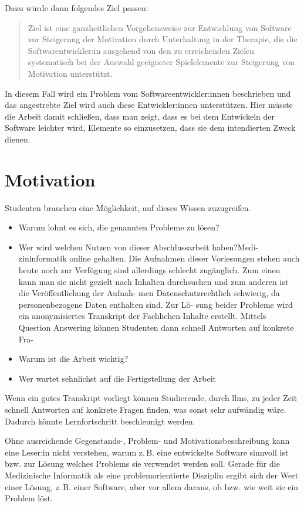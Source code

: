 Dazu würde dann folgendes Ziel passen:
\blockquote{Ziel ist eine ganzheitlichen Vorgehensweise zur Entwicklung von Software zur Steigerung der Motivation durch Unterhaltung in der Therapie, die die Softwarentwickler:in ausgehend von den zu erreichenden Zielen systematisch bei der Auswahl geeigneter Spielelemente zur Steigerung von Motivation unterstützt.}
In diesem Fall wird ein Problem vom Softwareentwickler:innen beschrieben und das angestrebte Ziel wird auch diese Entwickler:innen unterstützen.
Hier müsste die Arbeit damit schließen, dass man zeigt, dass es bei dem Entwickeln der Software leichter wird, Elemente so einzusetzen, dass sie dem intendierten Zweck dienen.
\fi

\section{Motivation}

Studenten brauchen eine Möglichkeit, auf dieses Wissen zuzugreifen. 

\begin{itemize}
\item Warum lohnt es sich, die genannten Probleme zu lösen?
\item Wer wird welchen Nutzen von dieser Abschlussarbeit haben?Medi-
zininformatik online gehalten. Die Aufnahmen dieser Vorlesungen stehen auch heute
noch zur Verfügung sind allerdings schlecht zugänglich. Zum einen kann man sie nicht
gezielt nach Inhalten durchsuchen und zum anderen ist die Veröffentlichung der Aufnah-
men Datenschutzrechtlich schwierig, da personenbezogene Daten enthalten sind. Zur Lö-
sung beider Probleme wird ein anonymisiertes Transkript der Fachlichen Inhalte erstellt.
Mittels Question Answering können Studenten dann schnell Antworten auf konkrete Fra-
\item Warum ist die Arbeit wichtig?
\item Wer wartet sehnlichst auf die Fertigstellung der Arbeit
\end{itemize}

Wenn ein gutes Transkript vorliegt können Studierende, durch \acp{llm}, zu jeder Zeit schnell Antworten auf konkrete Fragen finden, was sonst sehr aufwändig wäre. Dadurch könnte Lernfortschritt beschleunigt werden.


Ohne ausreichende Gegenstands-, Problem- und Motivationsbeschreibung kann eine Leser:in nicht verstehen, warum z.\,B. eine entwickelte Software sinnvoll ist bzw. zur Lösung welches Problems sie verwendet werden soll.
Gerade für die Medizinische Informatik als eine problemorientierte Disziplin ergibt sich der Wert einer Lösung, z.\,B. einer Software, aber vor allem daraus, ob bzw. wie weit sie ein Problem löst.

